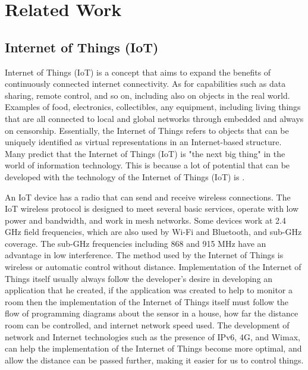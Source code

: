 \documentclass[twocolumn,10pt]{asme2ej}
\begin{document}
	\section{Related Work}
	\subsection{Internet of Things (IoT)}
	Internet of Things (IoT) is a concept that aims to expand the benefits of continuously connected internet connectivity. As for capabilities such as data sharing, remote control, and so on, including also on objects in the real world. Examples of food, electronics, collectibles, any equipment, including living things that are all connected to local and global networks through embedded and always on censorship. Essentially, the Internet of Things refers to objects that can be uniquely identified as virtual representations in an Internet-based structure. Many predict that the Internet of Things (IoT) is "the next big thing" in the world of information technology. This is because a lot of potential that can be developed with the technology of the Internet of Things (IoT) is \cite{Zeinab}.
	
	An IoT device has a radio that can send and receive wireless connections. The IoT wireless protocol is designed to meet several basic services, operate with low power and bandwidth, and work in mesh networks. Some devices work at 2.4 GHz field frequencies, which are also used by Wi-Fi and Bluetooth, and sub-GHz coverage. The sub-GHz frequencies including 868 and 915 MHz have an advantage in low interference. The method used by the Internet of Things is wireless or automatic control without distance. Implementation of the Internet of Things itself usually always follow the developer's desire in developing an application that he created, if the application was created to help to monitor a room then the implementation of the Internet of Things itself must follow the flow of programming diagrams about the sensor in a house, how far the distance room can be controlled, and internet network speed used. The development of network and Internet technologies such as the presence of IPv6, 4G, and Wimax, can help the implementation of the Internet of Things become more optimal, and allow the distance can be passed further, making it easier for us to control things\cite{Zeinab}.
	
\end{document}
